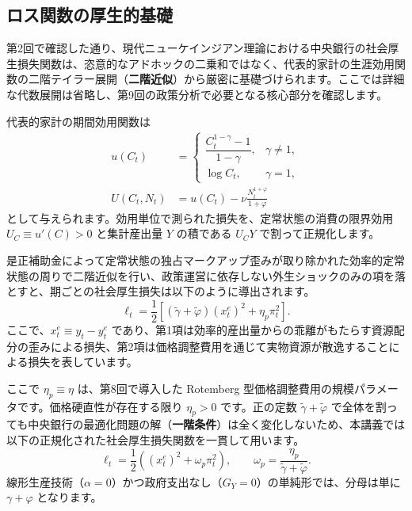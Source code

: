 \documentclass[
  japanese,
  lualatex,
  ja=standard,
  12pt,
  a4paper]{ltjsarticle}
\begin{document}
\subsection{ロス関数の厚生的基礎}\label{ux30edux30b9ux95a2ux6570ux306eux539aux751fux7684ux57faux790e}

第2回で確認した通り、現代ニューケインジアン理論における中央銀行の社会厚生損失関数は、恣意的なアドホックの二乗和ではなく、代表的家計の生涯効用関数の二階テイラー展開（\textbf{二階近似}）から厳密に基礎づけられます。ここでは詳細な代数展開は省略し、第9回の政策分析で必要となる核心部分を確認します。

代表的家計の期間効用関数は \[
\begin{aligned}
u(C_t)
&=
\begin{cases}
\dfrac{C_t^{1-\gamma}-1}{1-\gamma}, & \gamma\neq1,\\[6pt]
\log C_t, & \gamma=1,
\end{cases}\\
U(C_t,N_t)
&=
u(C_t)-\nu\frac{N_t^{1+\varphi}}{1+\varphi}
\end{aligned}
\]
として与えられます。効用単位で測られた損失を、定常状態の消費の限界効用
\(U_C \equiv u'(C)>0\) と集計産出量 \(Y\) の積である \(U_CY\)
で割って正規化します。

是正補助金によって定常状態の独占マークアップ歪みが取り除かれた効率的定常状態の周りで二階近似を行い、政策運営に依存しない外生ショックのみの項を落とすと、期ごとの社会厚生損失は以下のように導出されます。
\[
\ell_t
=
\frac{1}{2}
\left[
(\tilde{\gamma}+\tilde{\varphi})\left(x_t^e\right)^2+\eta_p\pi_t^2
\right].
\] ここで、\(x_t^e \equiv y_t - y_t^e\)
であり、第1項は効率的産出量からの乖離がもたらす資源配分の歪みによる損失、第2項は価格調整費用を通じて実物資源が散逸することによる損失を表しています。

ここで \(\eta_p \equiv \eta\) は、第8回で導入した Rotemberg
型価格調整費用の規模パラメータです。価格硬直性が存在する限り
\(\eta_p>0\) です。正の定数 \(\tilde{\gamma}+\tilde{\varphi}\)
で全体を割っても中央銀行の最適化問題の解（\textbf{一階条件}）は全く変化しないため、本講義では以下の正規化された社会厚生損失関数を一貫して用います。
\[
\ell_t
=
\frac{1}{2}
\left(
\left(x_t^e\right)^2+\omega_p\pi_t^2
\right),
\qquad
\omega_p
=
\frac{\eta_p}{\tilde{\gamma}+\tilde{\varphi}}.
\]
線形生産技術（\(\alpha=0\)）かつ政府支出なし（\(G_Y=0\)）の単純形では、分母は単に
\(\gamma+\varphi\) となります。
\end{document}

